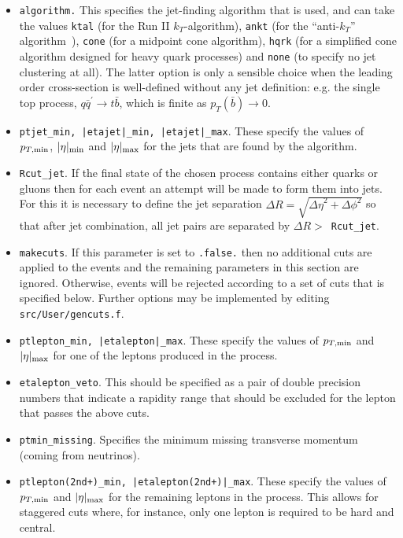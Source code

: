 \documentclass[12pt]{article}
\begin{document}
\begin{itemize}
\item {\tt algorithm.} This specifies the jet-finding algorithm that
is used, and can take the values
{\tt ktal} (for the Run II $k_T$-algorithm), {\tt ankt} (for the
``anti-$k_T$'' algorithm~\cite{Cacciari:2008}), {\tt cone} (for
a midpoint cone algorithm), {\tt hqrk} (for a simplified cone
algorithm designed for heavy quark processes) and {\tt none} (to
specify no jet clustering at all). The latter option is only a
sensible choice when the leading order cross-section is well-defined
without any jet definition: e.g. the single top process,
$q{\bar q^\prime} \to t{\bar b}$, which is finite as
$p_T({\bar b}) \to 0$.

\item {\tt ptjet\_min, |etajet|\_min, |etajet|\_max}. These specify the values
of $p_{T,{\rm min}}$, $|\eta|_{\rm min}$ and $|\eta|_{\rm max}$ for the
jets that are found by the algorithm. 

\item {\tt Rcut\_jet}. If the final state of the chosen process contains
either quarks or gluons then for each event an attempt will be made
to form them into jets. For this it is necessary to define the
jet separation $\Delta R=\sqrt{{\Delta \eta}^2 + {\Delta \phi}^2}$
so that after jet combination, all jet pairs are separated by
$\Delta R >$~{\tt Rcut\_jet}.

\item {\tt makecuts}. If this parameter is set to {\tt .false.} then
no additional cuts are applied to the events and the remaining
parameters in this section are ignored. Otherwise, events will
be rejected according to a set of cuts that is specified below.
Further options may be implemented by editing {\tt src/User/gencuts.f}.

\item {\tt ptlepton\_min, |etalepton|\_max}. These specify the values
of $p_{T,{\rm min}}$ and $|\eta|_{\rm max}$ for one of the leptons produced
in the process.

\item {\tt etalepton\_veto}. This should be specified as a pair of double
precision numbers that indicate a rapidity range that should be excluded
for the lepton that passes the above cuts.

\item {\tt ptmin\_missing}. Specifies the minimum missing transverse
momentum (coming from neutrinos).

\item {\tt ptlepton(2nd+)\_min, |etalepton(2nd+)|\_max}. These specify
the values of $p_{T,{\rm min}}$ and $|\eta|_{\rm max}$ for the remaining
leptons in the process. This allows for staggered cuts where, for
instance, only one lepton is required to be hard and central.


\end{itemize}
\end{document}
